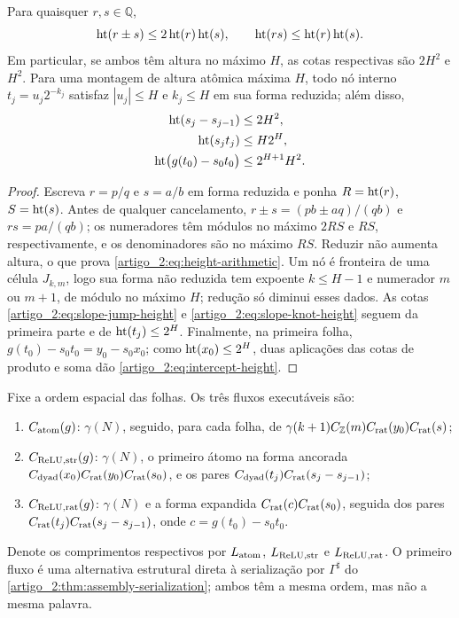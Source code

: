\begin{lemma}\label{map:artigo_2:3.11}
\label{artigo_2:lem:height-arithmetic}
Para quaisquer $r,s\in\mathbb Q$,
\begin{equation}
 \operatorname{ht}(r\pm s)\le2\operatorname{ht}(r)\operatorname{ht}(s),
 \qquad
 \operatorname{ht}(rs)\le\operatorname{ht}(r)\operatorname{ht}(s).
 \label{artigo_2:eq:height-arithmetic}
\end{equation}
Em particular, se ambos têm altura no máximo $H$, as cotas respectivas são
$2H^2$ e $H^2$.
Para uma montagem de altura atômica máxima $H$, todo nó interno
$t_j=u_j2^{-k_j}$ satisfaz $|u_j|\le H$ e $k_j\le H$ em sua forma reduzida;
além disso,
\begin{align}
 \operatorname{ht}(s_j-s_{j-1})&\le2H^2,\label{artigo_2:eq:slope-jump-height}\\
 \operatorname{ht}(s_jt_j)&\le H2^H,\label{artigo_2:eq:slope-knot-height}\\
 \operatorname{ht}\bigl(g(t_0)-s_0t_0\bigr)&\le2^{H+1}H^2.
 \label{artigo_2:eq:intercept-height}
\end{align}
\end{lemma}

\begin{proof}
Escreva $r=p/q$ e $s=a/b$ em forma reduzida e ponha
$R=\operatorname{ht}(r)$, $S=\operatorname{ht}(s)$. Antes de qualquer cancelamento,
$r\pm s=(pb\pm aq)/(qb)$ e $rs=pa/(qb)$; os numeradores têm módulos no
máximo $2RS$ e $RS$, respectivamente, e os denominadores são no máximo
$RS$. Reduzir não aumenta altura, o que prova
\eqref{artigo_2:eq:height-arithmetic}. Um nó é fronteira de uma célula
$J_{k,m}$, logo sua forma não reduzida tem expoente $k\le H-1$ e numerador
$m$ ou $m+1$, de módulo no máximo $H$; redução só diminui esses dados. As
cotas \eqref{artigo_2:eq:slope-jump-height} e \eqref{artigo_2:eq:slope-knot-height} seguem da
primeira parte e de $\operatorname{ht}(t_j)\le2^H$. Finalmente, na primeira folha,
$g(t_0)-s_0t_0=y_0-s_0x_0$; como
$\operatorname{ht}(x_0)\le2^H$, duas aplicações das cotas de produto e soma dão
\eqref{artigo_2:eq:intercept-height}.
\end{proof}

Fixe a ordem espacial das folhas. Os três fluxos executáveis são:
\begin{enumerate}[label=(\roman*),leftmargin=2.1em]
 \item $C_{\rm atom}(g)$: $\gamma(N)$, seguido, para cada folha, de
 $\gamma(k+1)C_{\mathbb Z}(m)C_{\rm rat}(y_0)C_{\rm rat}(s)$;
 \item $C_{\rm ReLU,str}(g)$: $\gamma(N)$, o primeiro átomo na forma ancorada
 $C_{\rm dyad}(x_0)C_{\rm rat}(y_0)C_{\rm rat}(s_0)$, e os pares
 $C_{\rm dyad}(t_j)C_{\rm rat}(s_j-s_{j-1})$;
 \item $C_{\rm ReLU,rat}(g)$: $\gamma(N)$ e a forma expandida
 $C_{\rm rat}(c)C_{\rm rat}(s_0)$, seguida dos pares
 $C_{\rm rat}(t_j)C_{\rm rat}(s_j-s_{j-1})$, onde
 $c=g(t_0)-s_0t_0$.
\end{enumerate}
Denote os comprimentos respectivos por $L_{\rm atom}$,
$L_{\rm ReLU,str}$ e $L_{\rm ReLU,rat}$. O primeiro fluxo é uma alternativa
estrutural direta à serialização por $\Gamma^\sharp$ do
\cref{artigo_2:thm:assembly-serialization}; ambos têm a mesma ordem, mas não a mesma
palavra.

